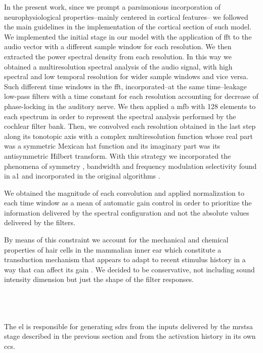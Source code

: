\documentclass[10pt,letterpaper]{article}
\begin{document}
In the present work, since we prompt a parsimonious incorporation of neurophysiological
properties--mainly centered in cortical features--
we followed the main guidelines in the implementation of the cortical section of such model. 
We implemented the initial stage in our model with the application of \gls{fft} to the audio vector
with a different sample window for each resolution.
We then extracted the power spectral density from each resolution.
In this way we obtained a multiresolution spectral analysis of the audio signal,
with high spectral and low temporal resolution for wider sample windows and
vice versa.
Such different time windows in the \gls{fft},
incorporated--at the same time--leakage low-pass filters with a time constant for each
resolution accounting for decrease of phase-locking in the auditory nerve.
We then applied a \gls{mfb} with 128 elements to each spectrum
in order to represent the spectral analysis performed by the cochlear filter bank.
Then, we convolved each resolution obtained in the last step along its tonotopic axis
with a complex multiresolution function whose real part
was a symmetric Mexican hat function and its imaginary part was its antisymmetric Hilbert transform.
With this strategy we incorporated the phenomena of symmetry \cite{shamma_1993}, bandwidth \cite{schreiner_1990}
and frequency modulation selectivity \cite{shamma_1993,heil_1992,mendelson_1985}
found in \gls{a1} and incorporated in the original algorithms \cite{wang_1995}.

We obtained the magnitude of each convolution and applied normalization to each time window
as a mean of automatic gain control in order to prioritize the information delivered by the
spectral configuration and not the absolute values delivered by the filters. 

By means of this constraint we account for the mechanical and chemical properties of hair cells in the mammalian inner ear
which constitute a transduction mechanism that appears to adapt to recent stimulus history in a way that can affect its gain
\cite{eatock_2000,holt_2000,le_goff_2005}. 
We decided to be conservative, not including
sound intensity dimension but just the shape of the filter responses.



~\\
~\\
~\\

The \gls{el} is responsible for generating \glspl{sdr} from the inputs delivered by the \gls{mrstsa} stage
described in the previous section and from the activation history in its own \glspl{cc}.
\end{document}
